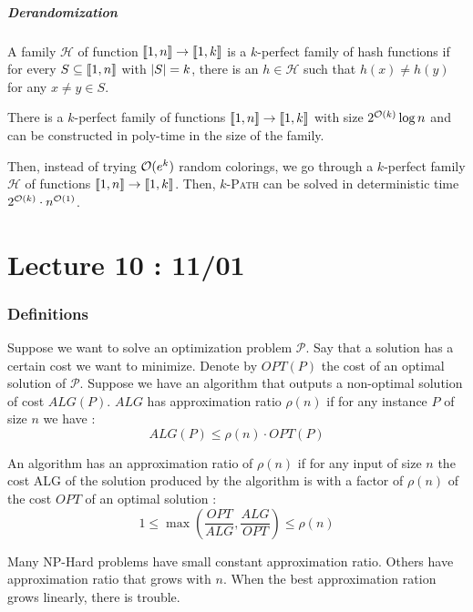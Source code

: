 \documentclass[12pt]{cours}
\begin{document}
\subsubsection{Derandomization}
\begin{definition}
    A family $\mathcal{H}$ of function $\left\llbracket 1, n\right\rrbracket \rightarrow \left\llbracket 1, k\right\rrbracket$ is a $k$-perfect family of hash functions if for every $S \subseteq \left\llbracket 1, n\right\rrbracket$ with $\left|S\right| = k$, there is an $h \in \mathcal{H}$ such that $h(x) \neq h(y)$ for any $x\neq y \in S$.
\end{definition}

\begin{theorem}
    There is a $k$-perfect family of functions $\left\llbracket 1, n\right\rrbracket \rightarrow \left\llbracket 1, k\right\rrbracket$ with size $2^{\mathcal{O}(k)}\log n$ and can be constructed in poly-time in the size of the family. 
\end{theorem}

Then, instead of trying $\mathcal{O}(e^{k})$ random colorings, we go through a $k$-perfect family $\mathcal{H}$ of functions $\left\llbracket 1, n\right\rrbracket \rightarrow \left\llbracket 1, k\right\rrbracket$. Then, $k$-\textsc{Path} can be solved in deterministic time $2^{\mathcal{O}(k)}\cdot n^{\mathcal{O}(1)}$.


\part[Approximation Algorithm]{Lecture 10 : 11/01}
\section{Definitions}
Suppose we want to solve an optimization problem $\mathcal{P}$. Say that a solution has a certain cost we want to minimize. Denote by $OPT(P)$ the cost of an optimal solution of $\mathcal{P}$. Suppose we have an algorithm that outputs a non-optimal solution of cost $ALG(P)$. $ALG$ has approximation ratio $\rho(n)$ if for any instance $P$ of size $n$ we have : \[ ALG(P) \leq \rho(n)\cdot OPT(P)\] 

\begin{definition}
    An algorithm has an approximation ratio of $\rho(n)$ if for any input of size $n$ the cost ALG of the solution produced by the algorithm is with a factor of $\rho(n)$ of the cost $OPT$ of an optimal solution : 
    \[
        1 \leq \max \left(\frac{OPT}{ALG}, \frac{ALG}{OPT}\right) \leq \rho(n)
    \]
\end{definition}

Many NP-Hard problems  have small constant approximation ratio. Others have approximation ratio that grows with $n$. When the best approximation ration grows linearly, there is trouble. 
\end{document}
